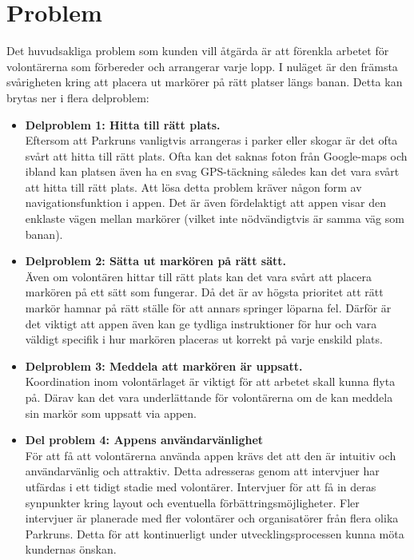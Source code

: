 \section{Problem}
Det huvudsakliga problem som kunden vill åtgärda är att förenkla arbetet för volontärerna som förbereder och arrangerar varje lopp. I nuläget är den främsta svårigheten kring att placera ut markörer på rätt platser längs banan. Detta kan brytas ner i flera delproblem:
\begin{itemize}
    \item \textbf{Delproblem 1: Hitta till rätt plats.}\\
        Eftersom att Parkruns vanligtvis arrangeras i parker eller skogar är det ofta svårt att hitta till rätt plats. Ofta kan det saknas foton från Google-maps och ibland kan platsen även ha en svag GPS-täckning således kan det vara svårt att hitta till rätt plats. 
        Att lösa detta problem kräver någon form av navigationsfunktion i appen. Det är även fördelaktigt att appen visar den enklaste vägen mellan markörer (vilket inte nödvändigtvis är samma väg som banan).  
    \item \textbf{Delproblem 2: Sätta ut markören på rätt sätt.}\\
        Även om volontären hittar till rätt plats kan det vara svårt att placera markören på ett sätt som fungerar. Då det är av högsta prioritet att rätt markör hamnar på rätt ställe för att annars springer löparna fel. Därför är det viktigt att appen även kan ge tydliga instruktioner för hur och vara väldigt specifik i hur markören placeras ut korrekt på varje enskild plats. 

    \item \textbf{Delproblem 3: Meddela att markören är uppsatt.}\\
        Koordination inom volontärlaget är viktigt för att arbetet skall kunna flyta på. Därav kan det vara underlättande för volontärerna om de kan meddela sin markör som uppsatt via appen.

    \item \textbf{Del problem 4: Appens användarvänlighet} \\
    För att få att volontärerna använda  appen krävs det att den är intuitiv och användarvänlig och attraktiv. Detta adresseras genom att intervjuer har utfärdas i ett tidigt stadie med volontärer. Intervjuer för att få in deras synpunkter kring layout och eventuella förbättringsmöjligheter. Fler intervjuer är planerade med fler volontärer och organisatörer från flera olika Parkruns. Detta för att kontinuerligt under utvecklingsprocessen kunna möta kundernas önskan.


\end{itemize}

